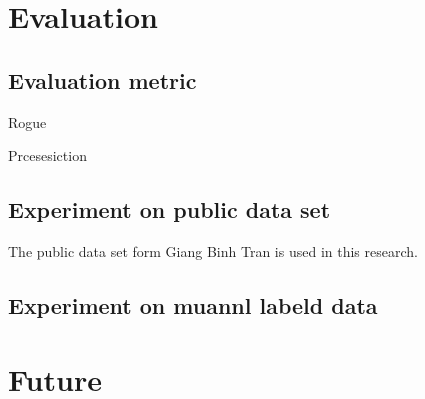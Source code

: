 \documentclass{llncs}
\begin{document}
%
\section{Evaluation}
%

\subsection{Evaluation metric}

Rogue

Prcesesiction

\subsection{Experiment on public data set}

The public data set form Giang Binh Tran\cite{tran2013leveraging} is used in this research.  



\subsection{Experiment on muannl labeld data}




%
\section{Future}
%




\end{document}
